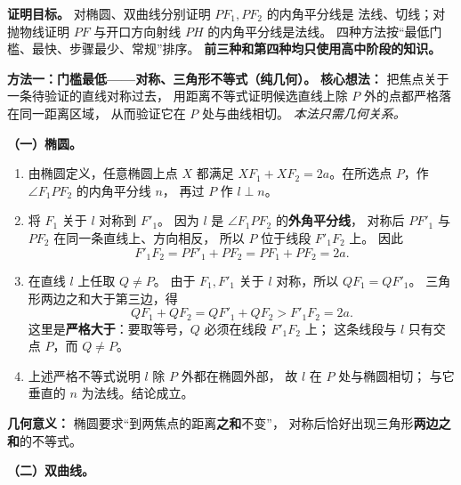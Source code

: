 \begin{proofbox}
\textbf{证明目标。} 对椭圆、双曲线分别证明 $PF_1,PF_2$ 的内角平分线是
法线、切线；对抛物线证明 $PF$ 与开口方向射线 $PH$ 的内角平分线是法线。
四种方法按“最低门槛、最快、步骤最少、常规”排序。
\textbf{前三种和第四种均只使用高中阶段的知识。}

\medskip\noindent
\end{proofbox}
\clearpage
\begin{proofbox}
\textbf{方法一：门槛最低——对称、三角形不等式（纯几何）。}
\textbf{核心想法：} 把焦点关于一条待验证的直线对称过去，
用距离不等式证明候选直线上除 $P$ 外的点都严格落在同一距离区域，
从而验证它在 $P$ 处与曲线相切。
\emph{本法只需几何关系。}

\par\medskip\begin{minipage}{\linewidth}
\textbf{（一）椭圆。}
\begin{center}\end{center}
\end{minipage}\par

\begin{enumerate}
\item 由椭圆定义，任意椭圆上点 $X$ 都满足
$XF_1+XF_2=2a$。在所选点 $P$，作 $\angle F_1PF_2$ 的内角平分线 $n$，
再过 $P$ 作 $l\perp n$。
\item 将 $F_1$ 关于 $l$ 对称到 $F'_1$。
因为 $l$ 是 $\angle F_1PF_2$ 的\textbf{外角平分线}，
对称后 $PF'_1$ 与 $PF_2$ 在同一条直线上、方向相反，
所以 $P$ 位于线段 $F'_1F_2$ 上。
因此
\[
F'_1F_2=PF'_1+PF_2=PF_1+PF_2=2a.
\]
\item 在直线 $l$ 上任取 $Q\ne P$。
由于 $F_1,F'_1$ 关于 $l$ 对称，所以 $QF_1=QF'_1$。
三角形两边之和大于第三边，得
\[
QF_1+QF_2=QF'_1+QF_2>F'_1F_2=2a.
\]
这里是\textbf{严格大于}：要取等号，$Q$ 必须在线段 $F'_1F_2$ 上；
这条线段与 $l$ 只有交点 $P$，而 $Q\ne P$。
\item 上述严格不等式说明 $l$ 除 $P$ 外都在椭圆外部，
故 $l$ 在 $P$ 处与椭圆相切；
与它垂直的 $n$ 为法线。结论成立。
\end{enumerate}
\textbf{几何意义：} 椭圆要求“到两焦点的距离\textbf{之和}不变”，
对称后恰好出现三角形\textbf{两边之和}的不等式。

\par\medskip\begin{minipage}{\linewidth}
\textbf{（二）双曲线。}
\begin{center}\end{center}
\end{minipage}\par


\end{proofbox}
